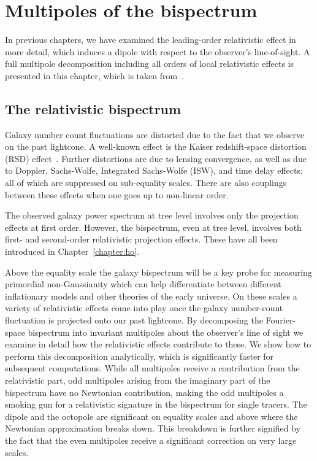 
\chapter{Multipoles of the bispectrum}
\label{chapter:multipoles}

In previous chapters, we have examined the leading-order relativistic effect in more detail, which induces a dipole with respect to the observer's line-of-sight. A full multipole decomposition including all orders of local relativistic effects is presented in this chapter, which is taken from~\cite{deWeerd:2019cae}.

\section{The relativistic bispectrum}
\label{sec:relbisp}

Galaxy number count fluctuations are distorted due to the fact that we observe on the past lightcone. A well-known effect is the Kaiser redshift-space distortion (RSD) effect~\citep{Verde:1998zr,Scoccimarro:1999ed}. Further distortions are due to lensing convergence, as well as due to Doppler, Sachs-Wolfe, Integrated Sachs-Wolfe (ISW), and time delay effects; all of which are suppressed on sub-equality scales. There are also couplings between these effects when one goes up to non-linear order. 

The observed galaxy power spectrum at tree level involves only the projection effects at first order. However, the bispectrum, even at tree level, involves both first- and second-order relativistic projection effects. These have all been introduced in Chapter~\ref{chapter:ho}.

Above the equality scale the galaxy bispectrum will be  a key probe for measuring primordial non-Gaussianity which can help differentiate between different inflationary models and other theories of the early universe. On these scales a variety of relativistic effects come into play once the galaxy number-count fluctuation is projected onto our past lightcone. By decomposing the Fourier-space bispectrum into invariant multipoles about the observer's line of sight we examine in detail how the relativistic effects contribute to these. We show how to perform this decomposition analytically, which is significantly faster for subsequent computations.  While all multipoles receive a contribution from the relativistic part, odd multipoles arising from the imaginary part of the bispectrum have no Newtonian contribution, making the odd multipoles a smoking gun for a relativistic signature in the bispectrum for single tracers.  The dipole and the octopole are significant on equality scales and above where the Newtonian approximation breaks down. This breakdown is further signified by the fact that the even multipoles receive a significant correction on very large scales.

